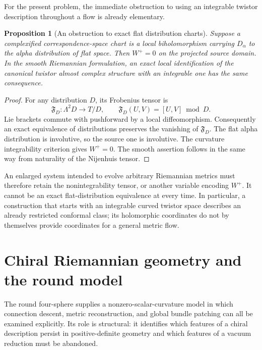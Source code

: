 \documentclass[11pt]{article}
\numberwithin{equation}{section}
\newtheorem{proposition}[theorem]{Proposition}
\theoremstyle{definition}
\theoremstyle{remark}
\begin{document}
For the present problem, the immediate obstruction to using an integrable
twistor description throughout a flow is already elementary.

\begin{proposition}[An obstruction to exact flat distribution charts]
\label{prop:ctx-flat-distribution}
Suppose a complexified correspondence-space chart is a local
biholomorphism carrying $D_\alpha$ to the alpha distribution of flat
space.  Then $W^+=0$ on the projected source domain.  In the smooth
Riemannian formulation, an exact local identification of the canonical
twistor almost complex structure with an integrable one has the same
consequence.
\end{proposition}
\begin{proof}
For any distribution $D$, its Frobenius tensor is
\[
 \mathfrak F_D:\Lambda^2D\longrightarrow T/D,
 \qquad \mathfrak F_D(U,V)=[U,V]\bmod D.
\]
Lie brackets commute with pushforward by a local diffeomorphism.
Consequently an exact equivalence of distributions preserves the
vanishing of $\mathfrak F_D$.  The flat alpha distribution is
involutive, so the source one is involutive.  The curvature integrability
criterion gives $W^+=0$.  The smooth assertion follows in the same way
from naturality of the Nijenhuis tensor.
\end{proof}

An enlarged system intended to evolve arbitrary Riemannian metrics
must therefore retain the nonintegrability tensor, or another variable
encoding $W^+$.  It cannot be an exact flat-distribution equivalence
at every time.  In particular, a construction that starts with an
integrable curved twistor space describes an already restricted
conformal class; its holomorphic coordinates do not by themselves
provide coordinates for a general metric flow.



\section{Chiral Riemannian geometry and the round model}
\label{sec:round-model}

The round four-sphere supplies a nonzero-scalar-curvature model in which
connection descent, metric reconstruction, and global bundle patching can all
be examined explicitly.  Its role is structural: it identifies which features
of a chiral description persist in positive-definite geometry and which
features of a vacuum reduction must be abandoned.
\end{document}
